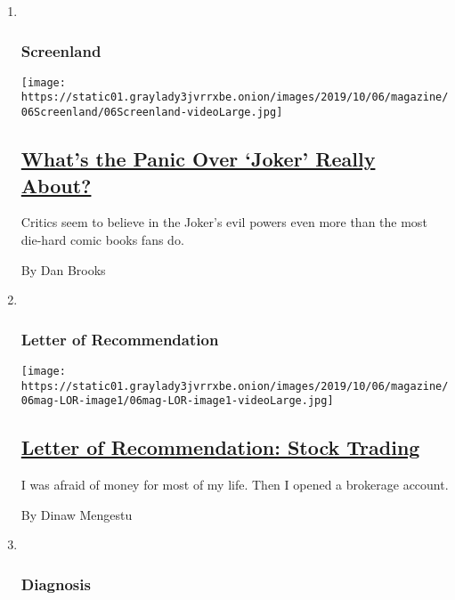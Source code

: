 \begin{enumerate}
\def\labelenumi{\arabic{enumi}.}
\item ~
  \hypertarget{screenland}{%
  \subsubsection{Screenland}\label{screenland}}

  \texttt{[image: https://static01.graylady3jvrrxbe.onion/images/2019/10/06/magazine/06Screenland/06Screenland-videoLarge.jpg]}

  \hypertarget{whats-the-panic-over-joker-really-about}{%
  \subsection{\texorpdfstring{\href{/2019/10/02/magazine/the-joker-movie.html}{What's
  the Panic Over `Joker' Really
  About?}}{What's the Panic Over `Joker' Really About?}}\label{whats-the-panic-over-joker-really-about}}

  Critics seem to believe in the Joker's evil powers even more than the
  most die-hard comic books fans do.

  By Dan Brooks
\item ~
  \hypertarget{letter-of-recommendation}{%
  \subsubsection{Letter of
  Recommendation}\label{letter-of-recommendation}}

  \texttt{[image: https://static01.graylady3jvrrxbe.onion/images/2019/10/06/magazine/06mag-LOR-image1/06mag-LOR-image1-videoLarge.jpg]}

  \hypertarget{letter-of-recommendation-stock-trading}{%
  \subsection{\texorpdfstring{\href{/2019/10/01/magazine/letter-of-recommendation-stock-trading.html}{Letter
  of Recommendation: Stock
  Trading}}{Letter of Recommendation: Stock Trading}}\label{letter-of-recommendation-stock-trading}}

  I was afraid of money for most of my life. Then I opened a brokerage
  account.

  By Dinaw Mengestu
\item ~
  \hypertarget{diagnosis}{%
  \subsubsection{Diagnosis}\label{diagnosis}}


\end{enumerate}

